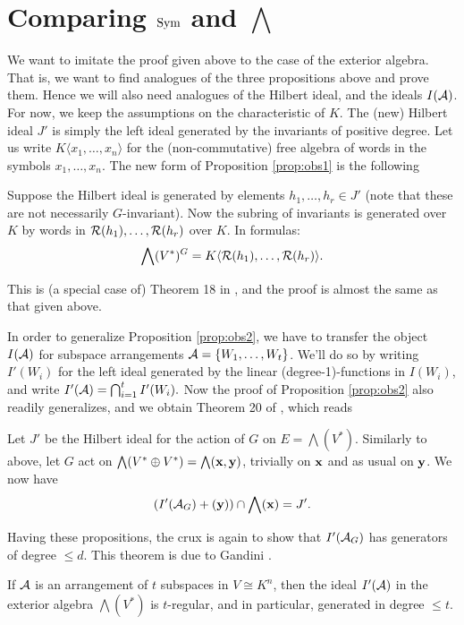 \documentclass[../main.tex]{subfiles}
\begin{document}
\section{Comparing $\operatorname{Sym}$ and $\bigwedge$}
We want to imitate the proof given above to the case of the exterior algebra.
That is, we want to find analogues of the three propositions above and
prove them. Hence we will also need analogues of the Hilbert ideal, and the 
ideals $I(\mathcal{A})$.
For now, we keep the assumptions on the characteristic of $K$.
The (new) Hilbert ideal $J'$ is simply the left ideal generated by the
invariants of positive degree.
Let us write $K\langle x_1, \dots, x_n \rangle$ for the (non-commutative) free
algebra of words in the symbols $x_1, \dots, x_n$. 
The new form of Proposition \ref{prop:obs1} is the following
\begin{prop}\label{prop:newobs1}
    Suppose the Hilbert ideal is generated by elements $h_1, \dots, h_r \in J'$ 
    (note that these are not necessarily $G$-invariant). Now the subring of invariants
    is generated over $K$ by words in $\mathcal{R}(h_1), \dots, \mathcal{R}(h_r)$ over $K$. In
    formulas:
    \begin{equation*}
        \bigwedge(V^*)^G = K\langle\mathcal{R}(h_1), \dots, \mathcal{R}(h_r)\rangle.
    \end{equation*}
\end{prop}
This is (a special case of) Theorem 18 in \cite{gandini2021degree}, and the proof
is almost the same as that given above.

In order to generalize Proposition \ref{prop:obs2}, we have to transfer 
the object $I(\mathcal{A})$ for subspace arrangements $\mathcal{A} = \{W_1, \dots, W_t\}$. We'll 
do so by writing $I'(W_i)$ for the left ideal generated by the linear
(degree-1)-functions in $I(W_i)$, and write $I'(\mathcal{A}) = \bigcap_{i = 1}^t
I'(W_i).$ Now the proof of Proposition \ref{prop:obs2} also readily
generalizes, and we obtain Theorem 20 of \cite{gandini2021degree}, which reads
\begin{prop}
    Let $J'$ be the Hilbert ideal for the action of $G$ on $E = \bigwedge(V^*)$.
    Similarly to above, let $G$ act on $\bigwedge(V^* \oplus V^*) =
    \bigwedge(\mathbf{x}, \mathbf{y})$, trivially on $\mathbf{x}$ and as usual on $\mathbf{y}$. We now have
    \begin{equation*}
        (I'(\mathcal{A}_G) + (\mathbf{y})) \cap \bigwedge(\mathbf{x}) = J'.
    \end{equation*}
\end{prop}

Having these propositions, the crux is again to show that $I'(\mathcal{A}_G)$ has
generators of degree $\leq d$. This theorem is due to Gandini \cite[Theorem 9]{gandini2021degree}.
\begin{thm}\label{thm:newcrux}
    If $\mathcal{A}$ is an arrangement of $t$ subspaces in $V \cong K^n$, then the
    ideal $I'(\mathcal{A})$ in the exterior algebra $\bigwedge(V^*)$ is $t$-regular,
    and in particular, generated in degree $\leq t$. 
\end{thm}
\end{document}
